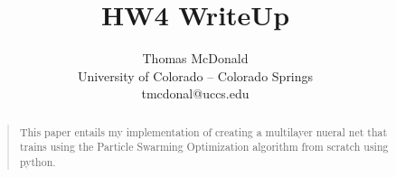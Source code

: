 \documentclass[letterpaper]{article}
\begin{document}
%
\title{HW4 WriteUp}
\author{ Thomas McDonald\\
University of Colorado – Colorado Springs\\
tmcdonal@uccs.edu\\
}
\maketitle
\begin{abstract}
\begin{quote}
This paper entails my implementation of creating a multilayer nueral net that trains using the Particle Swarming Optimization algorithm from scratch using python.  
\end{quote}
\end{abstract}
\end{document}
